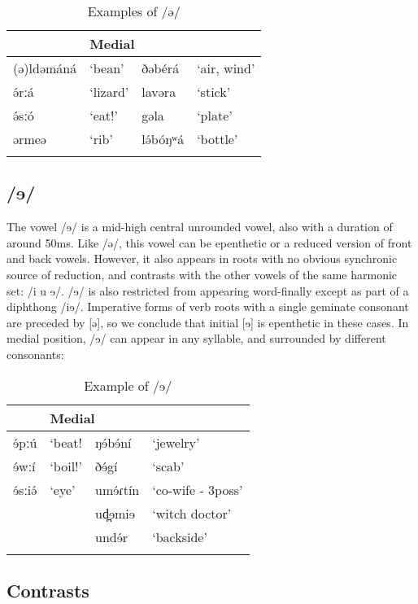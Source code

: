 \begin{table} 
\caption{Examples of /ə/}	
 \label{tab:ch2:9}
\begin{tabular}[t]{lp{3.5cm}lp{3.5cm}}
\lsptoprule
\multicolumn{2}{l}{Initial} &	\multicolumn{2}{l}{Medial}  \\
\midrule
(ə)ldəmáná	&	‘bean’	&	ðəbérá		&	‘air, wind’\\
ə́rːá		&	‘lizard’	&	lavəra		&	‘stick’\\
ə́sːó		&	‘eat!’	&	gəla			&	‘plate’\\
ərmeə		&	‘rib’		&	lə́bóŋʷá	&	‘bottle’\\
\lspbottomrule	
\end{tabular}
\end{table}

\subsection{/ɘ/}

The vowel /ɘ/ is a mid-high central unrounded vowel, also with a duration of around 50ms. Like /ə/, this vowel can be epenthetic or a reduced version of front and back vowels. However, it also appears in roots with no obvious synchronic source of reduction, and contrasts with the other vowels of the same harmonic set: /i u ɘ/. /ɘ/ is also restricted from appearing word-finally except as part of a diphthong /iɘ/. Imperative forms of verb roots with a single geminate consonant are preceded by [ə], so we conclude that initial [ɘ] is epenthetic in these cases. In medial position, /ɘ/ can appear in any syllable, and surrounded by different consonants:

\begin{table} 
\caption{Example of /ɘ/}	
 \label{tab:ch2:10}
\begin{tabular}[t]{lp{3.5cm}lp{3.5cm}}
\lsptoprule
\multicolumn{2}{l}{Initial} &	\multicolumn{2}{l}{Medial}  \\
\midrule
ɘ́pːú	&‘beat!	&ŋɘ́bɘ́ní	&	‘jewelry’\\
ɘ́wːí	&‘boil!’	&ðɘ́gí		&	‘scab’\\
ɘ́sːiə́	&‘eye’	&umɘ́ɾtín	&	‘co-wife - 3poss’\\
		&&ud̪ɘmiɘ			&	‘witch doctor’\\
		&&undɘ́r				&	‘backside’\\
\lspbottomrule	
\end{tabular}
\end{table}

\subsection{Contrasts}

